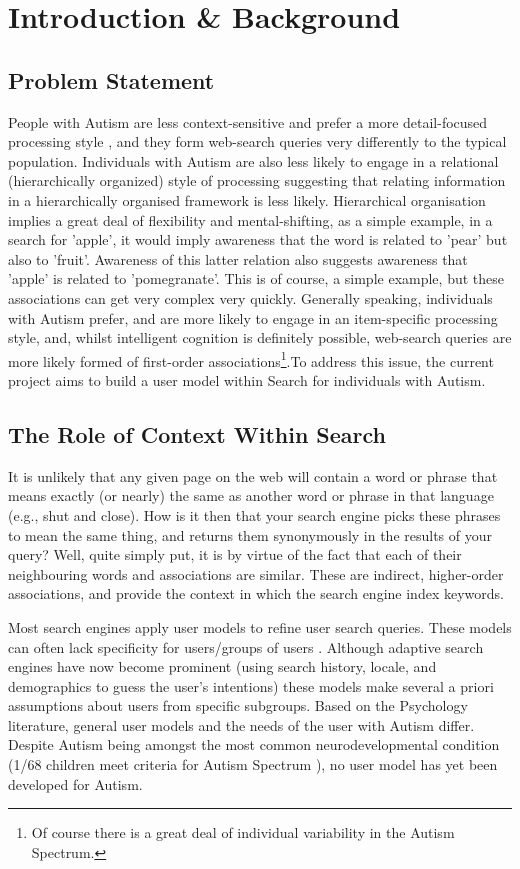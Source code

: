 \documentclass[a4paper, 10pt]{article}
\begin{document}
\section{Introduction \& Background}
\subsection{Problem Statement} \label{prob}
People with Autism are less context-sensitive and prefer a more detail-focused processing style \cite{mottron}, and they form web-search queries very differently to the typical population. Individuals with Autism are also less likely to engage in a relational (hierarchically organized) style of processing \cite{bowler} suggesting that relating information in a hierarchically organised framework is less likely. Hierarchical organisation implies a great deal of flexibility and mental-shifting, as a simple example, in a search for 'apple', it would imply awareness that the word is related to 'pear' but also to 'fruit'. Awareness of this latter relation also suggests awareness that 'apple' is related to 'pomegranate'. This is of course, a simple example, but these associations can get very complex very quickly. Generally speaking, individuals with Autism prefer, and are more likely to engage in an item-specific processing style, and, whilst intelligent cognition is definitely possible, web-search queries are more likely formed of first-order associations\footnote{Of course there is a great deal of individual variability in the Autism Spectrum.}.To address this issue, the current project aims to build a user model within Search for individuals with Autism. 

\subsection{The Role of Context Within Search} \label{the problem}
It is unlikely that any given page on the web will contain a word or phrase that means exactly (or nearly) the same as another word or phrase in that language (e.g., shut and close). How is it then that your search engine picks these phrases to mean the same thing, and returns them synonymously in the results of your query? Well, quite simply put, it is by virtue of the fact that each of their neighbouring words and associations are similar. These are indirect, higher-order associations, and provide the context in which the search engine index keywords.

Most search engines apply user models to refine user search queries. These models can often lack specificity for users/groups of users \cite{usermodel}. Although adaptive search engines have now become prominent (using search history, locale, and demographics to guess the user's intentions) these models make several a priori assumptions about users from specific subgroups. Based on the Psychology literature, general user models and the needs of the user with Autism differ. Despite Autism being amongst the most common neurodevelopmental condition (1/68 children meet criteria for Autism Spectrum \cite{CDC}), no user model has yet been developed for Autism. 
\end{document}
